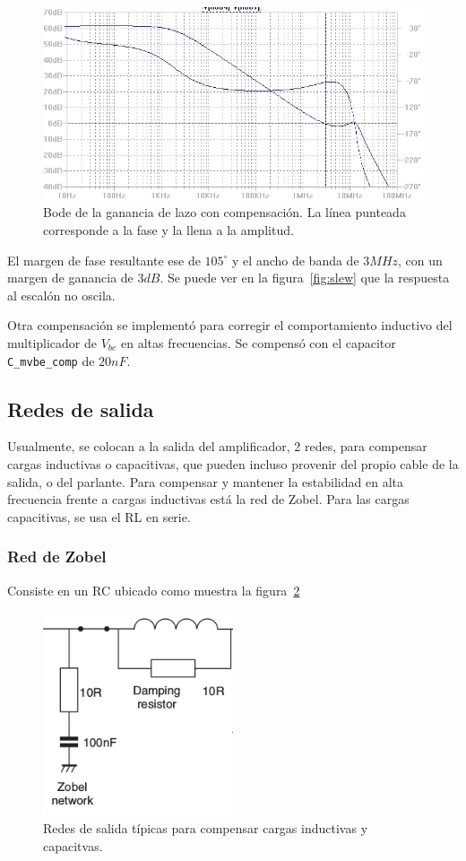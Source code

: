 \documentclass[a4paper,12pt,twoside]{article}
\begin{document}
\begin{figure}[H]
	\centering
	\includegraphics[height=0.4\textwidth]{img/sim/bode-la-con-comp}
	\caption{Bode de la ganancia de lazo con compensación. La línea punteada corresponde a la fase y la llena a la amplitud.}
	\label{fig:bode-la-con-comp}
\end{figure}


El margen de fase resultante ese de $105^{\circ}$ y el ancho de banda de $3MHz$, con un margen de ganancia de $3dB$. Se puede ver en la figura~\ref{fig:slew} que la respuesta al escalón no oscila.

Otra compensación se implementó para corregir el comportamiento inductivo del multiplicador de $V_{be}$ en altas frecuencias. Se compensó con el capacitor \texttt{C\_mvbe\_comp} de $20nF$.

\subsection{Redes de salida}

Usualmente, se colocan a la salida del amplificador, 2 redes, para compensar cargas inductivas o capacitivas, que pueden incluso provenir del propio cable de la salida, o del parlante. Para compensar y mantener la estabilidad en alta frecuencia frente a cargas inductivas está la red de Zobel. Para las cargas capacitivas, se usa el RL en serie.

\subsubsection{Red de Zobel}

Consiste en un RC ubicado como muestra la figura~\ref{fig:output-networks}

\begin{figure}[H]
\centering
\includegraphics[width=0.5\textwidth]{img/output-networks}
\caption{Redes de salida típicas para compensar cargas inductivas y capacitvas.}
\label{fig:output-networks} 
\end{figure}
\end{document}
